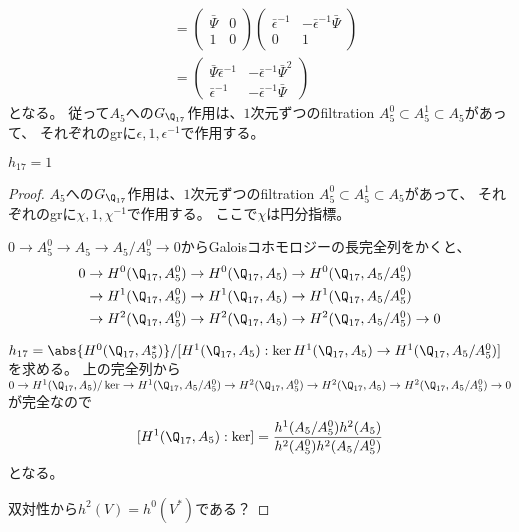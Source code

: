 \documentclass{jsarticle}
\begin{document}
\begin{align*}
&=\begin{pmatrix}\bar{\Psi}&0\\1&0\end{pmatrix}\begin{pmatrix}\bar{\epsilon}^{-1}&-\bar{\epsilon}^{-1}\bar{\Psi}\\0&1\end{pmatrix}\\
&=\begin{pmatrix}\bar{\Psi}\bar{\epsilon}^{-1}&-\bar{\epsilon}^{-1}\bar{\Psi}^2\\\bar{\epsilon}^{-1}&-\bar{\epsilon}^{-1}\bar{\Psi}\end{pmatrix}
\end{align*}
となる。
従って$A_5$への$G_{\Q_{17}}$作用は、$1$次元ずつのfiltration $A^0_5\subset A^1_5\subset A_5$があって、
それぞれのgrに$\epsilon, 1, \epsilon^{-1}$で作用する。
\begin{prop}
$h_{17}=1$
\end{prop}
\begin{proof}
$A_5$への$G_{\Q_{17}}$作用は、$1$次元ずつのfiltration $A^0_5\subset A^1_5\subset A_5$があって、
それぞれのgrに$\chi, 1, \chi^{-1}$で作用する。
ここで$\chi$は円分指標。

$0\to A^0_5\to A_5\to A_5/A^0_5\to 0$からGaloisコホモロジーの長完全列をかくと、
\begin{align*}
0&\to H^0(\Q_{17}, A_5^0)\to H^0(\Q_{17},A_5)\to H^0(\Q_{17},A_5/A_5^0)\\
&\to H^1(\Q_{17}, A_5^0)\to H^1(\Q_{17},A_5)\to H^1(\Q_{17},A_5/A_5^0)\\
&\to H^2(\Q_{17}, A_5^0)\to H^2(\Q_{17},A_5)\to H^2(\Q_{17},A_5/A_5^0)\to 0\\
\end{align*}

$h_{17}=\abs{H^0(\Q_{17},A^*_5)}/[H^1(\Q_{17},A_5):\ker H^1(\Q_{17},A_5)\to H^1(\Q_{17},A_5/A_5^0)]$を求める。
上の完全列から
$0\to H^1(\Q_{17},A_5)/\ker\to H^1(\Q_{17},A_5/A_5^0)
\to H^2(\Q_{17}, A_5^0)\to H^2(\Q_{17},A_5)\to H^2(\Q_{17},A_5/A_5^0)\to 0$が完全なので
\[
[H^1(\Q_{17},A_5):\ker]=\frac{h^1(A_5/A^0_5)h^2(A_5)}{h^2(A^0_5)h^2(A_5/A_5^0)}
\]
となる。

双対性から$h^2(V)=h^0(V^*)$である？
\end{proof}
\end{document}
